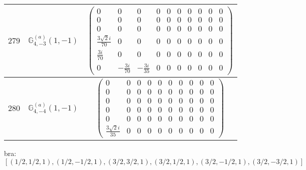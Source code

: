 \documentclass[fleqn,8pt,landscape]{jsarticle}
\begin{document}
\begin{center}
\begin{longtable}{ccc}
$ 279 $ & $ \mathbb{G}_{4,-3}^{(a)}(1,-1) $ & $ \begin{pmatrix} 0 & 0 & 0 & 0 & 0 & 0 & 0 & 0 & 0 & 0 \\ 0 & 0 & 0 & 0 & 0 & 0 & 0 & 0 & 0 & 0 \\ 0 & 0 & 0 & 0 & 0 & 0 & 0 & 0 & 0 & 0 \\ \frac{3 \sqrt{2} i}{70} & 0 & 0 & 0 & 0 & 0 & 0 & 0 & 0 & 0 \\ \frac{3 i}{70} & 0 & 0 & 0 & 0 & 0 & 0 & 0 & 0 & 0 \\ 0 & - \frac{3 i}{70} & - \frac{3 i}{35} & 0 & 0 & 0 & 0 & 0 & 0 & 0 \end{pmatrix} $ \\ \hline
$ 280 $ & $ \mathbb{G}_{4,-4}^{(a)}(1,-1) $ & $ \begin{pmatrix} 0 & 0 & 0 & 0 & 0 & 0 & 0 & 0 & 0 & 0 \\ 0 & 0 & 0 & 0 & 0 & 0 & 0 & 0 & 0 & 0 \\ 0 & 0 & 0 & 0 & 0 & 0 & 0 & 0 & 0 & 0 \\ 0 & 0 & 0 & 0 & 0 & 0 & 0 & 0 & 0 & 0 \\ 0 & 0 & 0 & 0 & 0 & 0 & 0 & 0 & 0 & 0 \\ \frac{3 \sqrt{2} i}{35} & 0 & 0 & 0 & 0 & 0 & 0 & 0 & 0 & 0 \end{pmatrix} $ \\
\end{longtable}
\end{center}
bra: $[(1/2,1/2,1),(1/2,-1/2,1),(3/2,3/2,1),(3/2,1/2,1),(3/2,-1/2,1),(3/2,-3/2,1)]$
\end{document}
